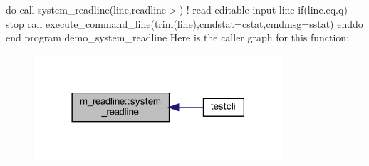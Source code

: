 do call system\+\_\+readline(line,\textquotesingle{}readline$>$\textquotesingle{}) ! read editable input line if(line.\+eq.\textquotesingle{}q\textquotesingle{}) stop call execute\+\_\+command\+\_\+line(trim(line),cmdstat=cstat,cmdmsg=sstat) enddo end program demo\+\_\+system\+\_\+readline Here is the caller graph for this function\+:
\nopagebreak
\begin{figure}[H]
\begin{center}
\leavevmode
\includegraphics[width=261pt]{namespacem__readline_a6eae368d34bd43ead64623b2d6d10ae0_icgraph}
\end{center}
\end{figure}
